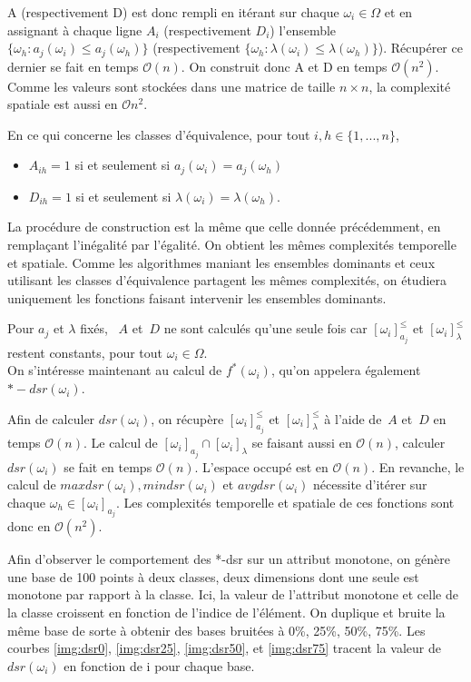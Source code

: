 \documentclass[a4paper]{article}
\begin{document}
A (respectivement D) est donc rempli en itérant sur chaque $\omega_i \in \Omega$
et en assignant à chaque ligne $A_i$ (respectivement $D_i$) l'ensemble
$\{\omega_h : a_j(\omega_i) \leq a_j(\omega_h)\}$ (respectivement $\{\omega_h :
\lambda(\omega_i) \leq \lambda(\omega_h)\}$). Récupérer ce dernier se fait en
temps $\mathcal{O}(n)$. On construit donc A et D en temps $\mathcal{O}(n^2)$.
Comme les valeurs sont stockées dans une matrice de taille $n \times n$, la
complexité spatiale est aussi en $\mathcal{O}{n^2}$.

En ce qui concerne les classes d'équivalence, pour tout $i, h \in \{1,...,n\}$,
\begin{itemize}
    \item $A_{ih} = 1$ si et seulement si $a_j(\omega_i) = a_j(\omega_h)$
    \item $D_{ih} = 1$ si et seulement si $\lambda(\omega_i) = \lambda(\omega_h)$. 
\end{itemize}
La procédure de construction est la même que celle donnée
précédemment, en remplaçant l'inégalité par l'égalité. On obtient les mêmes
complexités temporelle et spatiale. Comme les algorithmes maniant les ensembles
dominants et ceux utilisant les classes d'équivalence partagent les mêmes
complexités, on étudiera uniquement les fonctions faisant intervenir les
ensembles dominants. 

Pour $a_j$ et $\lambda$ fixés, ~$A$ et~$D$ ne sont calculés qu'une seule fois car
$[\omega_i]^{\leq}_{a_j}$ et $[\omega_i]^{\leq}_{\lambda}$ restent constants,
pour tout $\omega_i \in \Omega$. \\

On s'intéresse maintenant au calcul de $f^*(\omega_i)$, qu'on appelera également
$*-dsr(\omega_i)$.

Afin de calculer $dsr(\omega_i)$, on récupère $[\omega_i]^{\leq}_{a_j}$ et
$[\omega_i]^{\leq}_{\lambda}$ à l'aide de~$A$ et~$D$ en temps $\mathcal{O}(n)$. Le calcul de
$[\omega_i]_{a_j} \cap [\omega_i]_{\lambda}$ se faisant aussi en $\mathcal{O}(n)$,
calculer $dsr(\omega_i)$ se fait en temps $\mathcal{O}(n)$. L'espace occupé est
en $\mathcal{O}(n)$. 
En revanche, le calcul de $maxdsr(\omega_i), mindsr(\omega_i)$ et
$avgdsr(\omega_i)$ nécessite d'itérer sur chaque $\omega_h \in
[\omega_i]_{a_j}$. Les complexités temporelle et spatiale de ces fonctions sont
donc en $\mathcal{O}(n^2).$

Afin d'observer le comportement des *-dsr sur un attribut monotone, on génère
une base de 100 points à deux classes, deux dimensions dont une seule est
monotone par rapport à la classe.  Ici, la valeur de l'attribut monotone et
celle de la classe croissent en fonction de l'indice de l'élément. On duplique
et bruite la même base de sorte à obtenir des bases bruitées à 0\%, 25\%, 50\%,
75\%.  Les courbes \ref{img:dsr0}, \ref{img:dsr25}, \ref{img:dsr50}, et
\ref{img:dsr75} tracent la valeur de $dsr(\omega_i)$ en fonction de i pour
chaque base. \\
\end{document}

